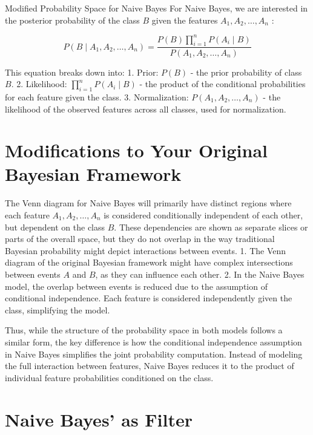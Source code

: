 \documentclass[
  12 pt,
  a4paper,
]{book}
\numberwithin{equation}{section}
\theoremstyle{plain}      %
\theoremstyle{definition} %
\theoremstyle{remark}     %
\theoremstyle{note}         %
\begin{document}
Modified Probability Space for Naive Bayes For Naive Bayes, we are
interested in the posterior probability of the class \(B\) given the
features \(A_1, A_2, \ldots, A_n\) :

\[
P\left(B \mid A_1, A_2, \ldots, A_n\right)=\frac{P(B) \prod_{i=1}^n P\left(A_i \mid B\right)}{P\left(A_1, A_2, \ldots, A_n\right)}
\]

This equation breaks down into: 1. Prior: \(P(B)\) - the prior
probability of class \(B\). 2. Likelihood:
\(\prod_{i=1}^n P\left(A_i \mid B\right)\) - the product of the
conditional probabilities for each feature given the class. 3.
Normalization: \(P\left(A_1, A_2, \ldots, A_n\right)\) - the likelihood
of the observed features across all classes, used for normalization.

\hypertarget{modifications-to-your-original-bayesian-framework}{%
\section{Modifications to Your Original Bayesian
Framework}\label{modifications-to-your-original-bayesian-framework}}

The Venn diagram for Naive Bayes will primarily have distinct regions
where each feature \(A_1, A_2, \ldots, A_n\) is considered conditionally
independent of each other, but dependent on the class \(B\). These
dependencies are shown as separate slices or parts of the overall space,
but they do not overlap in the way traditional Bayesian probability
might depict interactions between events. 1. The Venn diagram of the
original Bayesian framework might have complex intersections between
events \(A\) and \(B\), as they can influence each other. 2. In the
Naive Bayes model, the overlap between events is reduced due to the
assumption of conditional independence. Each feature is considered
independently given the class, simplifying the model.

Thus, while the structure of the probability space in both models
follows a similar form, the key difference is how the conditional
independence assumption in Naive Bayes simplifies the joint probability
computation. Instead of modeling the full interaction between features,
Naive Bayes reduces it to the product of individual feature
probabilities conditioned on the class.

\hypertarget{naive-bayes-as-filter}{%
\section{Naive Bayes' as Filter}\label{naive-bayes-as-filter}}
\end{document}
